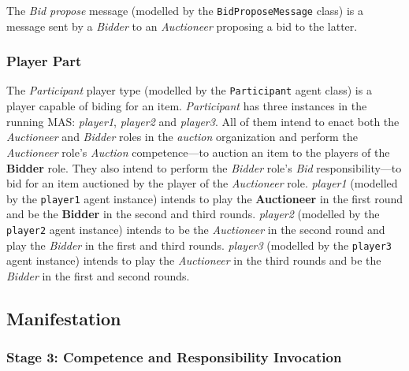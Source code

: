 The \textit{Bid propose} message (modelled by the \texttt{BidProposeMessage} class) is a message sent by a \textit{Bidder} to an \textit{Auctioneer} proposing a bid to the latter.

\subsubsection*{Player Part}

The \textit{Participant} player type (modelled by the \texttt{Participant} agent class) is a player capable of biding for an item.
\textit{Participant} has three instances in the running MAS: \textit{player1}, \textit{player2} and \textit{player3}.
All of them intend to enact both the \textit{Auctioneer} and \textit{Bidder} roles in the \textit{auction} organization and perform the \textit{Auctioneer} role's \textit{Auction} competence---to auction an item to the players of the \textbf{Bidder} role.
They also intend to perform the \textit{Bidder} role's \textit{Bid} responsibility---to bid for an item auctioned by the player of the \textit{Auctioneer} role.
\textit{player1} (modelled by the \texttt{player1} agent instance) intends to play the \textbf{Auctioneer} in the first round and be the \textbf{Bidder} in the second and third rounds.
\textit{player2} (modelled by the \texttt{player2} agent instance) intends to be the \textit{Auctioneer} in the second round and play the \textit{Bidder} in the first and third rounds.
\textit{player3} (modelled by the \texttt{player3} agent instance) intends to play the \textit{Auctioneer} in the third rounds and be the \textit{Bidder} in the first and second rounds.

\subsection*{Manifestation} 

\subsubsection*{Stage 3: Competence and Responsibility Invocation}

